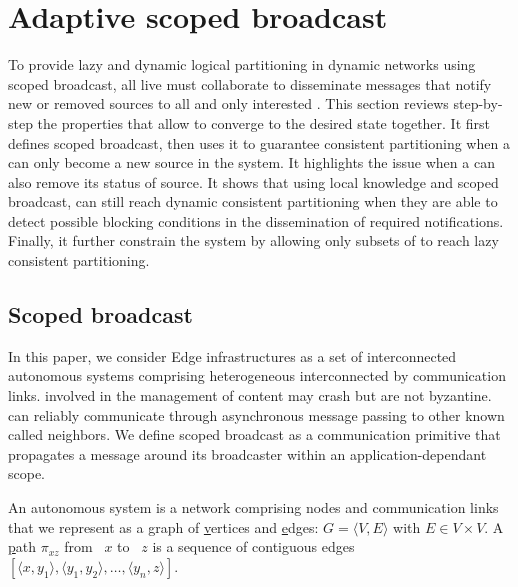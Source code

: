 
\section{Adaptive scoped broadcast}
\label{sec:adaptive}

To provide lazy and dynamic logical partitioning in dynamic networks
using scoped broadcast, all live \processes must collaborate to
disseminate messages that notify new or removed sources to all and
only interested \processes. This section reviews step-by-step the
properties that allow \processes to converge to the desired state
together. It first defines scoped broadcast, then uses it to guarantee
consistent partitioning when a \process can only become a new source
in the system. It highlights the issue when a \process can also remove
its status of source. It shows that using local knowledge and scoped
broadcast, \processes can still reach dynamic consistent partitioning
when they are able to detect possible blocking conditions in the
dissemination of required notifications. Finally, it further constrain
the system by allowing only subsets of \processes to reach lazy
consistent partitioning. 


\subsection{Scoped broadcast}
\label{subsec:scoped}

In this paper, we consider Edge infrastructures as a set of
interconnected autonomous systems comprising heterogeneous \nodes
interconnected by communication links. \Processes involved in the
management of content may crash but are not byzantine.  \Processes can
reliably communicate through asynchronous message passing to other
known \processes called neighbors.  We define scoped broadcast as a
communication primitive that propagates a message around its
broadcaster within an application-dependant scope.

\begin{definition}
  An autonomous system is a network comprising nodes and communication
  links that we represent as a \underline{g}raph of
  \underline{v}ertices and \underline{e}dges:
  $G = \langle V, E \rangle$ with $E \in V \times V$. A
  \underline{p}ath $\pi_{xz}$ from \Process~$x$ to \Process~$z$ is a
  sequence of contiguous edges
  $[\langle x, y_1 \rangle, \langle y_1, y_2\rangle, \ldots, \langle
  y_n, z \rangle]$.
\end{definition}

